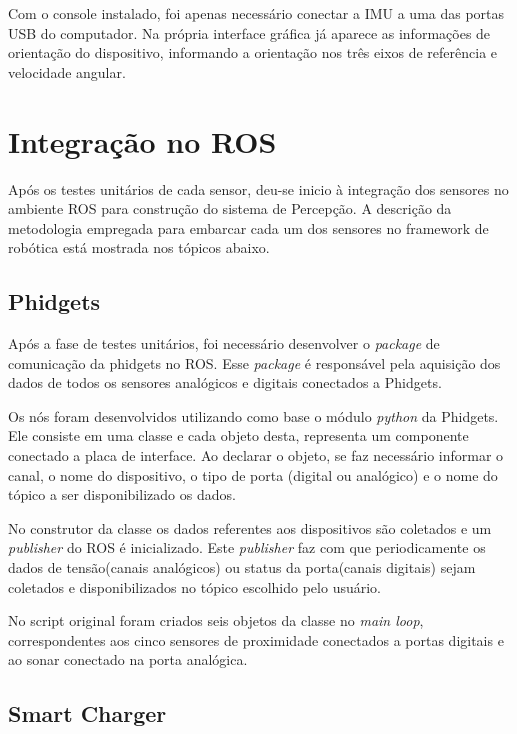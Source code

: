 	     Com o console instalado, foi apenas necessário conectar a IMU a uma das portas USB do computador. Na própria interface gráfica já aparece as informações de orientação do dispositivo, informando a orientação nos três eixos de referência e velocidade angular.
	
\section{Integração no ROS}
\label{sec:rosinte}

	Após os testes unitários de cada sensor, deu-se inicio à integração dos sensores no ambiente ROS para construção do sistema de Percepção. A descrição da metodologia empregada para embarcar cada um dos sensores no framework de robótica está mostrada nos tópicos abaixo.

\subsection{Phidgets}
     Após a fase de testes unitários, foi necessário desenvolver o \textit{package} de comunicação da phidgets no ROS. Esse \textit{package} é responsável pela aquisição dos dados de todos os sensores analógicos e digitais conectados a Phidgets.
     
     Os nós foram desenvolvidos utilizando como base o módulo \textit{python} da Phidgets. Ele consiste em uma classe e cada objeto desta, representa um componente conectado a placa de interface. Ao declarar o objeto, se faz necessário informar o canal, o nome do dispositivo, o tipo de porta (digital ou analógico) e o nome do tópico a ser disponibilizado os dados. 
     
     No construtor da classe os dados referentes aos dispositivos são coletados e um \textit{publisher} do ROS é inicializado. Este  \textit{publisher} faz com que periodicamente os dados de tensão(canais analógicos) ou status da porta(canais digitais) sejam coletados e disponibilizados no tópico escolhido pelo usuário. 
     
     No script original foram criados seis objetos da classe no \textit{main loop}, correspondentes aos cinco sensores de proximidade conectados a portas digitais e ao sonar conectado na porta analógica.
     
\subsection{Smart Charger}
     
